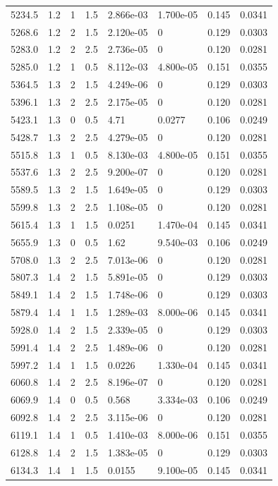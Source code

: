 \documentclass[preview]{standalone}
\begin{document}
{{{\begin{tabular}{L{1.2cm}C{1.2cm} C{0.3cm}C{0.5cm} C{1.4cm}C{1.4cm} C{1.4cm}C{1.4cm}}
  5234.5  &   1.2  & 1     & 1.5 &  2.866e-03  & 1.700e-05  & 0.145 &  0.0341   \\ 
  5268.6  &   1.2  & 2     & 1.5 &  2.120e-05  & 0  & 0.129 &  0.0303   \\ 
  5283.0  &   1.2  & 2     & 2.5 &  2.736e-05  & 0  & 0.120 &  0.0281   \\ 
  5285.0  &   1.2  & 1     & 0.5 &  8.112e-03  & 4.800e-05  & 0.151 &  0.0355   \\ 
  5364.5  &   1.3  & 2     & 1.5 &  4.249e-06  & 0  & 0.129 &  0.0303   \\ 
  5396.1  &   1.3  & 2     & 2.5 &  2.175e-05  & 0  & 0.120 &  0.0281   \\ 
  5423.1  &   1.3  & 0     & 0.5 &  4.71  & 0.0277  & 0.106 &  0.0249   \\ 
  5428.7  &   1.3  & 2     & 2.5 &  4.279e-05  & 0  & 0.120 &  0.0281   \\ 
  5515.8  &   1.3  & 1     & 0.5 &  8.130e-03  & 4.800e-05  & 0.151 &  0.0355   \\ 
  5537.6  &   1.3  & 2     & 2.5 &  9.200e-07  & 0  & 0.120 &  0.0281   \\ 
  5589.5  &   1.3  & 2     & 1.5 &  1.649e-05  & 0  & 0.129 &  0.0303   \\ 
  5599.8  &   1.3  & 2     & 2.5 &  1.108e-05  & 0  & 0.120 &  0.0281   \\ 
  5615.4  &   1.3  & 1     & 1.5 &  0.0251  & 1.470e-04  & 0.145 &  0.0341   \\ 
  5655.9  &   1.3  & 0     & 0.5 &  1.62  & 9.540e-03  & 0.106 &  0.0249   \\ 
  5708.0  &   1.3  & 2     & 2.5 &  7.013e-06  & 0  & 0.120 &  0.0281   \\ 
  5807.3  &   1.4  & 2     & 1.5 &  5.891e-05  & 0  & 0.129 &  0.0303   \\ 
  5849.1  &   1.4  & 2     & 1.5 &  1.748e-06  & 0  & 0.129 &  0.0303   \\ 
  5879.4  &   1.4  & 1     & 1.5 &  1.289e-03  & 8.000e-06  & 0.145 &  0.0341   \\ 
  5928.0  &   1.4  & 2     & 1.5 &  2.339e-05  & 0  & 0.129 &  0.0303   \\ 
  5991.4  &   1.4  & 2     & 2.5 &  1.489e-06  & 0  & 0.120 &  0.0281   \\ 
  5997.2  &   1.4  & 1     & 1.5 &  0.0226  & 1.330e-04  & 0.145 &  0.0341   \\ 
  6060.8  &   1.4  & 2     & 2.5 &  8.196e-07  & 0  & 0.120 &  0.0281   \\ 
  6069.9  &   1.4  & 0     & 0.5 &  0.568  & 3.334e-03  & 0.106 &  0.0249   \\ 
  6092.8  &   1.4  & 2     & 2.5 &  3.115e-06  & 0  & 0.120 &  0.0281   \\ 
  6119.1  &   1.4  & 1     & 0.5 &  1.410e-03  & 8.000e-06  & 0.151 &  0.0355   \\ 
  6128.8  &   1.4  & 2     & 1.5 &  1.383e-05  & 0  & 0.129 &  0.0303   \\ 
  6134.3  &   1.4  & 1     & 1.5 &  0.0155  & 9.100e-05  & 0.145 &  0.0341   \\ 
\hline 
\end{tabular} 

}}}
\end{document}
